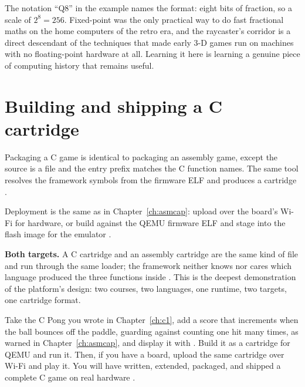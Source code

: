 \begin{prgaside}
The notation ``Q8'' in the example names the format: eight bits of fraction, so a
scale of $2^8 = 256$. Fixed-point was the only practical way to do fast fractional
maths on the home computers of the retro era, and the raycaster's corridor is a
direct descendant of the techniques that made early 3-D games run on machines with
no floating-point hardware at all. Learning it here is learning a genuine piece of
computing history that remains useful.
\end{prgaside}

\section{Building and shipping a C cartridge}

Packaging a C game is identical to packaging an assembly game, except the source
is a  file and the entry prefix matches the C function names. The same
 tool resolves the framework symbols from the firmware ELF
and produces a  cartridge \citep{prg32tutorialc}.



Deployment is the same as in Chapter~\ref{ch:asmcap}: upload over the board's Wi-Fi
for hardware, or build against the QEMU firmware ELF and stage into the flash image
for the emulator \citep{prg32qemu}.



\begin{prgtargets}
\textbf{Both targets.} A C cartridge and an assembly cartridge are the same kind of
file and run through the same loader; the framework neither knows nor cares which
language produced the three functions inside \citep{prg32teaching}. This is the
deepest demonstration of the platform's design: two courses, two languages, one
runtime, two targets, one cartridge format.
\end{prgtargets}

\begin{prgtry}
Take the C Pong you wrote in Chapter~\ref{ch:c1}, add a score that increments when
the ball bounces off the paddle, guarding against counting one hit many times, as
warned in Chapter~\ref{ch:asmcap}, and display it with .
Build it as a cartridge for QEMU and run it. Then, if you have a board, upload the
same cartridge over Wi-Fi and play it. You will have written, extended, packaged,
and shipped a complete C game on real \riscv hardware \citep{prg32repo}.
\end{prgtry}

